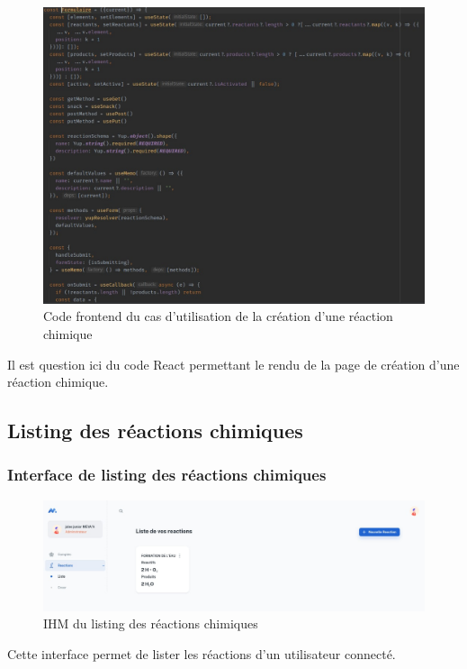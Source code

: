 \begin{figure}[H]
	\centering
	\includegraphics[width=1\textwidth]{img/frec}
	\caption{Code frontend du cas d'utilisation de la création d'une réaction chimique}
\end{figure}

Il est question ici du code React permettant le rendu de la page de création d'une réaction chimique.

\subsection{Listing des réactions chimiques}

\subsubsection{Interface de listing des réactions chimiques}

\begin{figure}[H]
	\centering
	\includegraphics[width=1\textwidth]{img/ilrc}
	\caption{IHM du listing des réactions chimiques}
\end{figure}

Cette interface permet de lister les réactions d'un utilisateur connecté.

